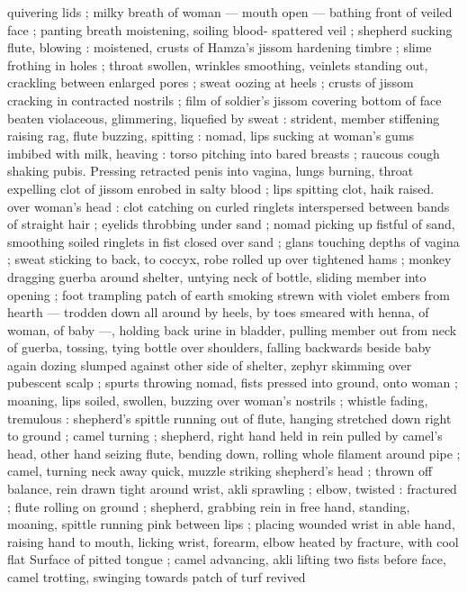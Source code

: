 quivering lids ; milky breath of woman --- mouth open --- bathing 
front of veiled face ; panting breath moistening, soiling blood- 
spattered veil ; shepherd sucking flute, blowing : moistened, crusts 
of Hamza's jissom hardening timbre ; slime frothing in holes ; throat 
swollen, wrinkles smoothing, veinlets standing out, crackling 
between enlarged pores ; sweat oozing at heels ; crusts of jissom 
cracking in contracted nostrils ; film of soldier's jissom covering 
bottom of face beaten violaceous, glimmering, liquefied by sweat : 
strident, member stiffening raising rag, flute buzzing, spitting : 
nomad, lips sucking at woman's gums imbibed with milk, heaving : 
torso pitching into bared breasts ; raucous cough shaking pubis. 
Pressing retracted penis into vagina, lungs burning, throat expelling 
clot of jissom enrobed in salty blood ; lips spitting clot, haik raised. 
over woman's head : clot catching on curled ringlets interspersed 
between bands of straight hair ; eyelids throbbing under sand ; 
nomad picking up fistful of sand, smoothing soiled ringlets in fist 
closed over sand ; glans touching depths of vagina ; sweat sticking 
to back, to coccyx, robe rolled up over tightened hams ; monkey 
dragging guerba around shelter, untying neck of bottle, sliding 
member into opening ; foot trampling patch of earth smoking strewn 
with violet embers from hearth --- trodden down all around by heels, 
by toes smeared with henna, of woman, of baby ---, holding back 
urine in bladder, pulling member out from neck of guerba, tossing, 
tying bottle over shoulders, falling backwards beside baby again 
dozing slumped against other side of shelter, zephyr skimming over 
pubescent scalp ; spurts throwing nomad, fists pressed into ground, 
onto woman ; moaning, lips soiled, swollen, buzzing over woman's 
nostrils ; whistle fading, tremulous : shepherd's spittle running out 
of flute, hanging stretched down right to ground ; camel turning ; 
shepherd, right hand held in rein pulled by camel's head, other hand 
seizing flute, bending down, rolling whole filament around pipe ; 
camel, turning neck away quick, muzzle striking shepherd's head ; 
thrown off balance, rein drawn tight around wrist, akli sprawling ; 
elbow, twisted : fractured ; flute rolling on ground ; shepherd, 
grabbing rein in free hand, standing, moaning, spittle running pink 
between lips ; placing wounded wrist in able hand, raising hand to 
mouth, licking wrist, forearm, elbow heated by fracture, with cool flat 
Surface of pitted tongue ; camel advancing, akli lifting two fists 
before face, camel trotting, swinging towards patch of turf revived 

